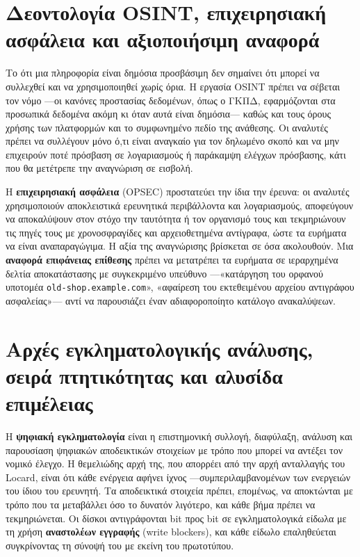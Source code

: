\documentclass[11pt,openany]{book}
\begin{document}
\section{Δεοντολογία OSINT, επιχειρησιακή ασφάλεια και αξιοποιήσιμη αναφορά}\label{sec:12.4}
Το ότι μια πληροφορία είναι δημόσια προσβάσιμη δεν σημαίνει ότι μπορεί να συλλεχθεί και να χρησιμοποιηθεί χωρίς όρια. Η εργασία OSINT πρέπει να σέβεται τον νόμο —οι κανόνες προστασίας δεδομένων, όπως ο ΓΚΠΔ, εφαρμόζονται στα προσωπικά δεδομένα ακόμη κι όταν αυτά είναι δημόσια— καθώς και τους όρους χρήσης των πλατφορμών και το συμφωνημένο πεδίο της ανάθεσης. Οι αναλυτές πρέπει να συλλέγουν μόνο ό,τι είναι αναγκαίο για τον δηλωμένο σκοπό και να μην επιχειρούν ποτέ πρόσβαση σε λογαριασμούς ή παράκαμψη ελέγχων πρόσβασης, κάτι που θα μετέτρεπε την αναγνώριση σε εισβολή.

Η \textbf{επιχειρησιακή ασφάλεια} (OPSEC) προστατεύει την ίδια την έρευνα: οι αναλυτές χρησιμοποιούν αποκλειστικά ερευνητικά περιβάλλοντα και λογαριασμούς, αποφεύγουν να αποκαλύψουν στον στόχο την ταυτότητα ή τον οργανισμό τους και τεκμηριώνουν τις πηγές τους με χρονοσφραγίδες και αρχειοθετημένα αντίγραφα, ώστε τα ευρήματα να είναι αναπαραγώγιμα. Η αξία της αναγνώρισης βρίσκεται σε όσα ακολουθούν. Μια \textbf{αναφορά επιφάνειας επίθεσης} πρέπει να μετατρέπει τα ευρήματα σε ιεραρχημένα δελτία αποκατάστασης με συγκεκριμένο υπεύθυνο —«κατάργηση του ορφανού υποτομέα \texttt{old-shop.example.com}», «αφαίρεση του εκτεθειμένου αρχείου αντιγράφου ασφαλείας»— αντί να παρουσιάζει έναν αδιαφοροποίητο κατάλογο ανακαλύψεων.

\section{Αρχές εγκληματολογικής ανάλυσης, σειρά πτητικότητας και αλυσίδα επιμέλειας}\label{sec:12.5}
Η \textbf{ψηφιακή εγκληματολογία} είναι η επιστημονική συλλογή, διαφύλαξη, ανάλυση και παρουσίαση ψηφιακών αποδεικτικών στοιχείων με τρόπο που μπορεί να αντέξει τον νομικό έλεγχο. Η θεμελιώδης αρχή της, που απορρέει από την αρχή ανταλλαγής του Locard, είναι ότι κάθε ενέργεια αφήνει ίχνος —συμπεριλαμβανομένων των ενεργειών του ίδιου του ερευνητή. Τα αποδεικτικά στοιχεία πρέπει, επομένως, να αποκτώνται με τρόπο που τα μεταβάλλει όσο το δυνατόν λιγότερο, και κάθε βήμα πρέπει να τεκμηριώνεται. Οι δίσκοι αντιγράφονται bit προς bit σε εγκληματολογικά είδωλα με τη χρήση \textbf{αναστολέων εγγραφής} (write blockers), και κάθε είδωλο επαληθεύεται συγκρίνοντας τη σύνοψή του με εκείνη του πρωτοτύπου.
\end{document}
